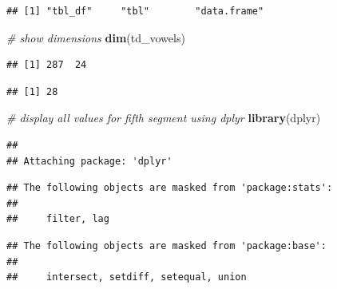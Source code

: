 \documentclass[]{book}
\newenvironment{Shaded}{\begin{snugshade}}{\end{snugshade}}
\newcommand{\CommentTok}[1]{\textcolor[rgb]{0.56,0.35,0.01}{\textit{#1}}}
\newcommand{\DecValTok}[1]{\textcolor[rgb]{0.00,0.00,0.81}{#1}}
\newcommand{\KeywordTok}[1]{\textcolor[rgb]{0.13,0.29,0.53}{\textbf{#1}}}
\newcommand{\NormalTok}[1]{#1}
\newcommand{\OperatorTok}[1]{\textcolor[rgb]{0.81,0.36,0.00}{\textbf{#1}}}
\newcommand{\StringTok}[1]{\textcolor[rgb]{0.31,0.60,0.02}{#1}}
\begin{document}
\begin{verbatim}
## [1] "tbl_df"     "tbl"        "data.frame"
\end{verbatim}

\begin{Shaded}
\begin{Highlighting}[]
\CommentTok{# show dimensions}
\KeywordTok{dim}\NormalTok{(td_vowels)}
\end{Highlighting}
\end{Shaded}

\begin{verbatim}
## [1] 287  24
\end{verbatim}

\begin{Shaded}
\end{Shaded}

\begin{verbatim}
## [1] 28
\end{verbatim}

\begin{Shaded}
\begin{Highlighting}[]
\CommentTok{# display all values for fifth segment using dplyr}
\KeywordTok{library}\NormalTok{(dplyr)}
\end{Highlighting}
\end{Shaded}

\begin{verbatim}
## 
## Attaching package: 'dplyr'
\end{verbatim}

\begin{verbatim}
## The following objects are masked from 'package:stats':
## 
##     filter, lag
\end{verbatim}

\begin{verbatim}
## The following objects are masked from 'package:base':
## 
##     intersect, setdiff, setequal, union
\end{verbatim}

\begin{Shaded}
\end{Shaded}
\end{document}
